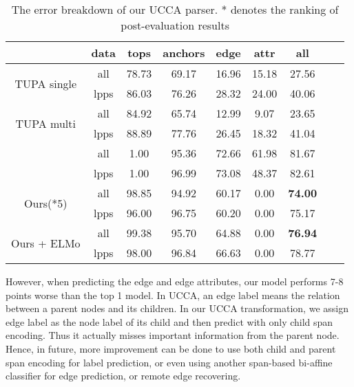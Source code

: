\begin{table}[!tbp]
  \caption{\label{tbl:results_ucca} The error breakdown of our UCCA
    parser. * denotes the ranking of post-evaluation results }
\small
\centering
\setlength{\tabcolsep}{3pt}

\begin{tabular}{ccccccccc}
\toprule
                              & data & tops  & anchors & edge  & attr  & all   \\ \hline
\multirow{2}{*}{ TUPA
single }                      & all  & 78.73 & 69.17   & 16.96 & 15.18 & 27.56 \\
                              & lpps & 86.03 & 76.26   & 28.32 & 24.00 & 40.06 \\
\multirow{2}{*}{ TUPA
multi }                       & all  & 84.92 & 65.74   & 12.99 &  9.07 & 23.65 \\
                              & lpps & 88.89 & 77.76   & 26.45 & 18.32 & 41.04 \\
\multirow{2}{*}{\citet{Che:Dou:Xu:19}}       & all  & 1.00  & 95.36   & 72.66 & 61.98 & 81.67 \\
                              & lpps & 1.00  & 96.99   & 73.08 & 48.37 & 82.61 \\ \hline
\multirow{2}{*}{ Ours(*5)}    & all  & 98.85 & 94.92   & 60.17 & 0.00  & {\bf 74.00} \\
                              & lpps & 96.00 & 96.75   & 60.20 & 0.00  & 75.17 \\
\multirow{2}{*}{ Ours + ELMo} & all  & 99.38 & 95.70   & 64.88 & 0.00  & {\bf 76.94} \\
                              & lpps & 98.00 & 96.84   & 66.63 & 0.00  & 78.77 \\ \bottomrule
\end{tabular}
\end{table}

However, when predicting the edge and edge attributes, our model
performs 7-8 points worse than the top 1 model. In UCCA, an edge label
means the relation between a parent nodes and its children. In our
UCCA transformation, we assign edge label as the node label of its
child and then predict with only child span encoding. Thus it actually
misses important information from the parent node. Hence, in future,
more improvement can be done to use both child and parent span
encoding for label prediction, or even using another span-based
bi-affine classifier for edge prediction, or remote edge recovering.

